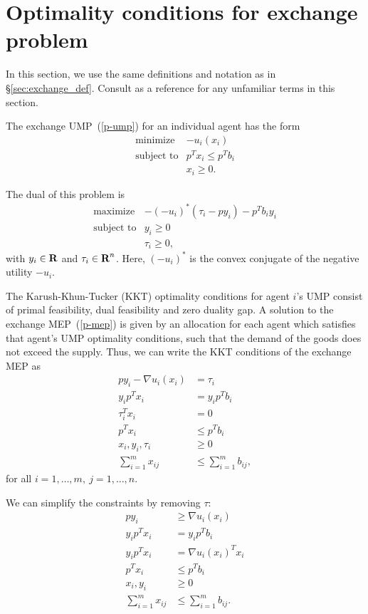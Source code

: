 \documentclass[12pt]{article}
\begin{document}
\appendix


\section{Optimality conditions for exchange problem}
\label{sec:exchange_proof}

In this section, we use the same definitions and notation as in
\S\ref{sec:exchange_def}.
Consult \cite{BoV:04} as a reference for any
unfamiliar terms in this section.

The exchange UMP~(\ref{p-ump}) for an individual agent has the form
\[
\begin{array}{ll}
\mbox{minimize} & - u_i(x_i)\\
\mbox{subject to} & p^T x_i \leq p^T b_i\\
& x_i \geq 0.
\end{array}
\]

The dual of this problem is
\[
\begin{array}{ll}
\mbox{maximize} & -(- u_i)^*(\tau_i - p y_i) - p^T b_i y_i\\
\mbox{subject to} & y_i \geq 0\\
& \tau_i \geq 0,
\end{array}
\]
with $y_i \in {\mbox{\bf R}}$ and $\tau_i \in {\mbox{\bf R}}^n$. Here, $(- u_i)^*$
is the convex conjugate of the negative utility $-u_i$.

The Karush-Khun-Tucker (KKT) optimality conditions for agent $i$'s UMP consist
of primal feasibility, dual feasibility and zero duality gap. A solution to the
exchange MEP~(\ref{p-mep}) is given by an allocation for each agent which
satisfies that agent's UMP optimality conditions, such that the demand of the
goods does not exceed the supply. Thus, we can write the KKT conditions of the
exchange MEP as
\begin{equation}
\begin{aligned}
p y_i - \nabla u_i(x_i)&= \tau_i\\
y_i p^T x_i &= y_i p^T b_i\\
\tau_i^T x_i &= 0\\
p^T x_i &\leq p^T b_i\\
x_i, y_i, \tau_i &\geq 0\\
\sum_{i=1}^m x_{ij} &\leq \sum_{i=1}^m b_{ij},
\end{aligned}
\label{e-mep-opt1}
\end{equation}
for all $i=1,\ldots,m,\ j=1,\ldots,n$.

We can simplify the constraints by removing $\tau$:
\begin{equation}
\begin{aligned}
p y_i &\geq \nabla u_i(x_i) \\
y_i p^T x_i &= y_i p^T b_i \\
y_i p^T x_i &= \nabla u_i(x_i)^T x_i\\
p^T x_i &\leq p^T b_i\\
x_i, y_i &\geq 0\\
\sum_{i=1}^m x_{ij} &\leq \sum_{i=1}^m b_{ij}.
\end{aligned}
\label{e-mep-opt2}
\end{equation}
\end{document}
